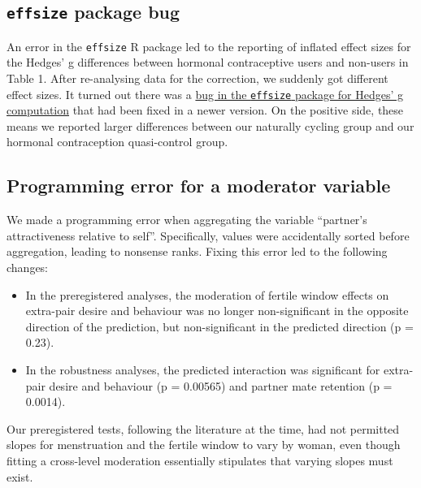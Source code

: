 \documentclass[]{article}
\providecommand{\tightlist}{%
  \setlength{\itemsep}{0pt}\setlength{\parskip}{0pt}}
\begin{document}
\hypertarget{effsize-package-bug}{%
\subsection{\texorpdfstring{\texttt{effsize} package
bug}{effsize package bug}}\label{effsize-package-bug}}

An error in the \texttt{effsize} R package led to the reporting of
inflated effect sizes for the Hedges' g differences between hormonal
contraceptive users and non-users in Table 1. After re-analysing data
for the correction, we suddenly got different effect sizes. It turned
out there was a
\href{https://github.com/mtorchiano/effsize/issues/32}{bug in the
\texttt{effsize} package for Hedges' g computation} that had been fixed
in a newer version. On the positive side, these means we reported larger
differences between our naturally cycling group and our hormonal
contraception quasi-control group.

\hypertarget{programming-error-for-a-moderator-variable}{%
\subsection{Programming error for a moderator
variable}\label{programming-error-for-a-moderator-variable}}

We made a programming error when aggregating the variable ``partner's
attractiveness relative to self''. Specifically, values were
accidentally sorted before aggregation, leading to nonsense ranks.
Fixing this error led to the following changes:

\begin{itemize}
\tightlist
\item
  In the preregistered analyses, the moderation of fertile window
  effects on extra-pair desire and behaviour was no longer
  non-significant in the opposite direction of the prediction, but
  non-significant in the predicted direction (p = 0.23).
\item
  In the robustness analyses, the predicted interaction was significant
  for extra-pair desire and behaviour (p = 0.00565) and partner mate
  retention (p = 0.0014).
\end{itemize}

Our preregistered tests, following the literature at the time, had not
permitted slopes for menstruation and the fertile window to vary by
woman, even though fitting a cross-level moderation essentially
stipulates that varying slopes must exist.
\end{document}
